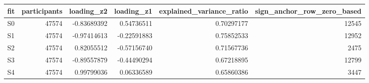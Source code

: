 \begin{tabular}{lrrrrr}
\toprule
fit & participants & loading_z2 & loading_z1 & explained_variance_ratio & sign_anchor_row_zero_based \\
\midrule
S0 & 47574 & -0.83689392 & 0.54736511 & 0.70297177 & 12545 \\
S1 & 47574 & -0.97414613 & -0.22591883 & 0.75852533 & 12952 \\
S2 & 47574 & 0.82055512 & -0.57156740 & 0.71567736 & 2475 \\
S3 & 47574 & -0.89557879 & -0.44490294 & 0.67218895 & 12799 \\
S4 & 47574 & 0.99799036 & 0.06336589 & 0.65860386 & 3447 \\
\bottomrule
\end{tabular}
